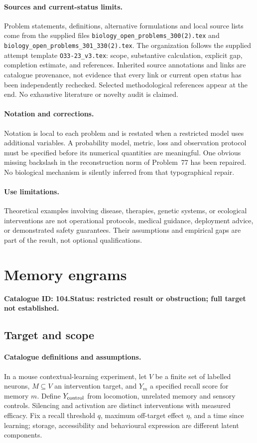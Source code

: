 \documentclass[11pt]{article}
\begin{document}
\paragraph{Sources and current-status limits.}
Problem statements, definitions, alternative formulations and local source lists
come from the supplied files
\texttt{biology\_open\_problems\_300(2).tex} and
\texttt{biology\_open\_problems\_301\_330(2).tex}.
The organization follows the supplied attempt template
\texttt{O33-23\_v3.tex}: scope, substantive calculation, explicit gap,
completion estimate, and references. Inherited source annotations and links are
catalogue provenance, not evidence that every link or current open status has
been independently rechecked. Selected methodological references appear at the
end. No exhaustive literature or novelty audit is claimed.

\paragraph{Notation and corrections.}
Notation is local to each problem and is restated when a restricted model uses
additional variables. A probability model, metric, loss and observation protocol
must be specified before its numerical quantities are meaningful. One obvious
missing backslash in the reconstruction norm of Problem~77 has been repaired.
No biological mechanism is silently inferred from that typographical repair.

\paragraph{Use limitations.}
Theoretical examples involving disease, therapies, genetic systems, or ecological
interventions are not operational protocols, medical guidance, deployment advice,
or demonstrated safety guarantees. Their assumptions and empirical gaps are part
of the result, not optional qualifications.

\setcounter{section}{103}
\section{Memory engrams}
\label{prob:104}
\noindent\textbf{Catalogue ID: 104.}\quad \textbf{Status: restricted result or obstruction; full target not established.}
\subsection{Target and scope}
\paragraph{Catalogue definitions and assumptions.}
In a mouse contextual-learning experiment, let $V$ be a finite set of labelled neurons, $M\subseteq V$ an intervention target, and $Y_m$ a specified recall score for memory $m$. Define $Y_{\rm control}$ from locomotion, unrelated memory and sensory controls. Silencing and activation are distinct interventions with measured efficacy. Fix a recall threshold $q$, maximum off-target effect $\eta$, and a time since learning; storage, accessibility and behavioural expression are different latent components.
\end{document}
